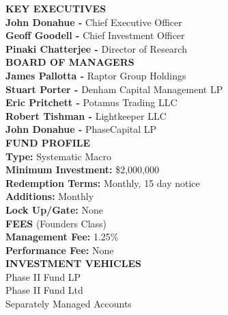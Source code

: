 \documentclass[9pt]{article}
\begin{document}
\linespread{0.85}
\headheight 35pt

\lhead{\bigfont{\textcolor{phaseGold}{Phase}\textcolor{phaseGrey}{Capital LP}}}

\thispagestyle{fancy}
\twocolumn

\textbf{\textcolor{phaseGold}{KEY EXECUTIVES}} \\
  \textbf{John Donahue -} Chief Executive Officer \\
  \textbf{Geoff Goodell -} Chief Investment Officer \\
  \textbf{Pinaki Chatterjee -} Director of Research \\

\textbf{\textcolor{phaseGold}{BOARD OF MANAGERS}} \\
  \textbf{James Pallotta -} Raptor Group Holdings \\
  \textbf{Stuart Porter -} Denham Capital Management LP \\
  \textbf{Eric Pritchett -} Potamus Trading LLC \\
  \textbf{Robert Tishman -} Lightkeeper LLC \\
  \textbf{John Donahue -} PhaseCapital LP \\

\textbf{\textcolor{phaseGold}{FUND PROFILE}} \\
  \textbf{Type:} Systematic Macro \\
  \textbf{Minimum Investment:} \$2,000,000 \\
  \textbf{Redemption Terms:} Monthly, 15 day notice \\
  \textbf{Additions:} Monthly \\
  \textbf{Lock Up/Gate:} None \\

\textbf{\textcolor{phaseGold}{FEES}} (Founders Class) \\
  \textbf{Management Fee:} 1.25\% \\
  \textbf{Performance Fee:} None \\

\textbf{\textcolor{phaseGold}{INVESTMENT VEHICLES}} \\
  Phase II Fund LP \\
  Phase II Fund Ltd \\
  Separately Managed Accounts \\
\end{document}
